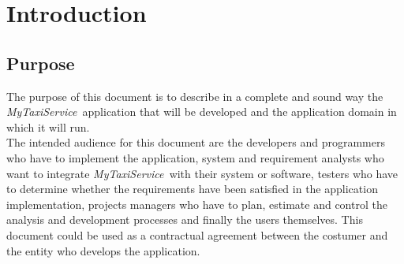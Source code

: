 \documentclass[a4paper,11pt]{report} %
\newcommand{\mts}{\mbox{\normalfont\itshape MyTaxiService\ }}
\begin{document}
	\section{Introduction}
	
	\subsection{Purpose} The purpose of this document is to describe in a complete and sound way
	the \mts application that will be developed and the application domain in which it will run.\\
	The intended audience for this document are the developers and programmers
	who have to implement the application, system and requirement
	analysts who want to integrate \mts with their system or software,
	testers who have to determine whether the requirements have been satisfied in
	the application implementation, projects managers who have to plan, estimate
	and control the analysis and development processes and finally the users themselves.
	This document could be used as a contractual agreement between the costumer
	and the entity who develops the application.
	
\end{document}
